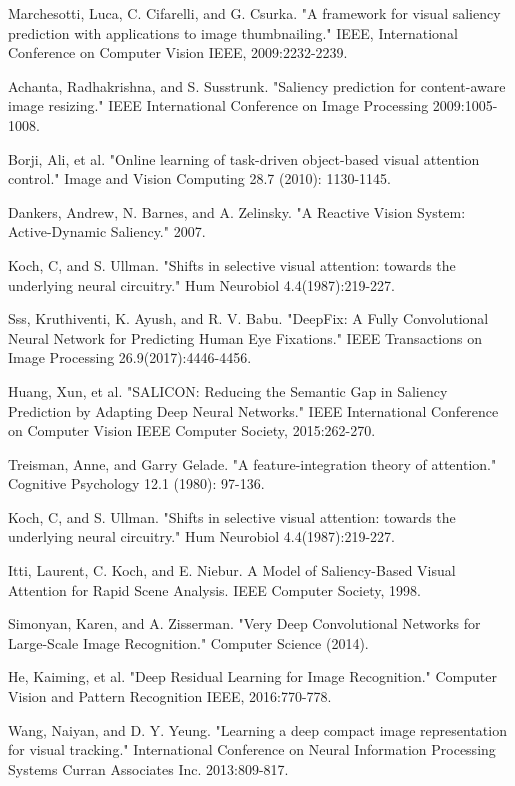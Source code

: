 \documentclass[letterpaper, 10 pt, conference]{ieeeconf}  %
\begin{document}
\begin{thebibliography}{00}

 Marchesotti, Luca, C. Cifarelli, and G. Csurka. "A framework for visual saliency prediction with applications to image thumbnailing." IEEE, International Conference on Computer Vision IEEE, 2009:2232-2239.

 Achanta, Radhakrishna, and S. Susstrunk. "Saliency prediction for content-aware image resizing." IEEE International Conference on Image Processing 2009:1005-1008.

 Borji, Ali, et al. "Online learning of task-driven object-based visual attention control." Image and Vision Computing 28.7 (2010): 1130-1145.

 Dankers, Andrew, N. Barnes, and A. Zelinsky. "A Reactive Vision System: Active-Dynamic Saliency." 2007.

 Koch, C, and S. Ullman. "Shifts in selective visual attention: towards the underlying neural circuitry." Hum Neurobiol 4.4(1987):219-227.

 Sss, Kruthiventi, K. Ayush, and R. V. Babu. "DeepFix: A Fully Convolutional Neural Network for Predicting Human Eye Fixations." IEEE Transactions on Image Processing 26.9(2017):4446-4456.

 Huang, Xun, et al. "SALICON: Reducing the Semantic Gap in Saliency Prediction by Adapting Deep Neural Networks." IEEE International Conference on Computer Vision IEEE Computer Society, 2015:262-270.

 Treisman, Anne, and Garry Gelade. "A feature-integration theory of attention." Cognitive Psychology 12.1 (1980): 97-136.

 Koch, C, and S. Ullman. "Shifts in selective visual attention: towards the underlying neural circuitry." Hum Neurobiol 4.4(1987):219-227.

 Itti, Laurent, C. Koch, and E. Niebur. A Model of Saliency-Based Visual Attention for Rapid Scene Analysis. IEEE Computer Society, 1998.

 Simonyan, Karen, and A. Zisserman. "Very Deep Convolutional Networks for Large-Scale Image Recognition." Computer Science (2014).

 He, Kaiming, et al. "Deep Residual Learning for Image Recognition." Computer Vision and Pattern Recognition IEEE, 2016:770-778.

 Wang, Naiyan, and D. Y. Yeung. "Learning a deep compact image representation for visual tracking." International Conference on Neural Information Processing Systems Curran Associates Inc. 2013:809-817.


\end{thebibliography}
\end{document}
